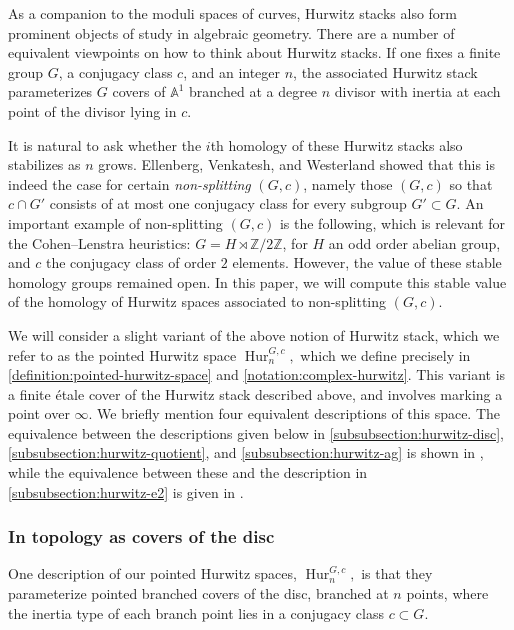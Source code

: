 \documentclass[12 pt]{amsart}
\theoremstyle{plain}
\theoremstyle{definition}
\theoremstyle{remark}
\numberwithin{equation}{section}
\newcommand{\phurc}[3]{\operatorname{Hur}^{#1, #3}_{#2}}
\begin{document}
	As a companion to the moduli spaces of curves, Hurwitz stacks also form
	prominent objects of study in algebraic geometry. 
	There are a number of equivalent viewpoints on how to think about
	Hurwitz stacks.
	If one fixes a finite group $G$, a conjugacy class
	$c$, and an integer $n$, the associated Hurwitz stack parameterizes
	$G$ covers of $\mathbb A^1$ branched at a degree $n$ divisor with
	inertia at each point of the divisor lying
	in $c$. 
	
	It is natural to ask whether the $i$th homology of these Hurwitz
	stacks also stabilizes as $n$ grows.
	Ellenberg, Venkatesh, and Westerland \cite{EllenbergVW:cohenLenstra}
	showed that this is indeed the case for certain {\em non-splitting}
	$(G,c)$, 
	namely those $(G,c)$ so that $c \cap G'$ consists of at most one conjugacy class for every subgroup $G' \subset G$.
	An important example of non-splitting $(G,c)$ is the following, which is relevant for the
	Cohen--Lenstra heuristics:
	$G = H \rtimes \mathbb Z/2 \mathbb Z$, for
	$H$ an odd order abelian group, and $c$ the conjugacy class of order
	$2$ elements.
	However, the value of these stable homology groups remained open.
	In this paper, we will compute this stable value of the homology of
	Hurwitz spaces associated to non-splitting $(G,c)$.

	We will consider a slight variant of the above notion of
	Hurwitz stack, which we refer to as the pointed Hurwitz space $\phurc G n c,$
	which we define precisely in \autoref{definition:pointed-hurwitz-space}
	and \autoref{notation:complex-hurwitz}.
	This variant is a
	finite \'etale cover of the Hurwitz stack described above, and involves marking
	a point over $\infty$. We briefly mention four equivalent descriptions of this
	space. The equivalence between the descriptions given below in
	\autoref{subsubsection:hurwitz-disc},
	\autoref{subsubsection:hurwitz-quotient}, and
	\autoref{subsubsection:hurwitz-ag} is shown in
	\cite[\S2.3]{EllenbergVW:cohenLenstra}, while the equivalence between
	these and the description in
	\autoref{subsubsection:hurwitz-e2} is given in \cite[Remark
	6.4]{randal-williams:homology-of-hurwitz-spaces}.

\subsubsection{In topology as covers of the disc}
\label{subsubsection:hurwitz-disc}
	One description of our pointed Hurwitz spaces, $\phurc G n c,$ is that they
parameterize pointed branched covers of the disc, branched at $n$ points, where the
inertia type of each branch point lies in a conjugacy class $c \subset G$. 
\end{document}
